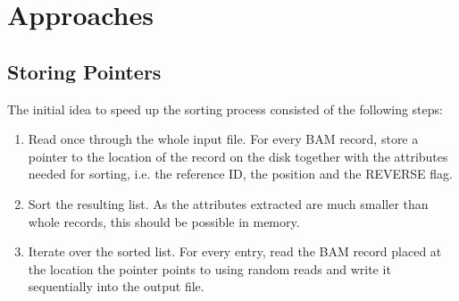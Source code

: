 \section{Approaches}
\subsection{Storing Pointers}
The initial idea to speed up the sorting process consisted of the following steps: 
\begin{enumerate}
    \item Read once through the whole input file. For every BAM record, store a pointer to the location of the record on the disk together with the attributes needed for sorting, i.e. the reference ID, the position and the REVERSE flag.
    \item Sort the resulting list. As the attributes extracted are much smaller than whole records, this should be possible in memory.
    \item Iterate over the sorted list. For every entry, read the BAM record placed at the location the pointer points to using random reads and write it sequentially into the output file.
\end{enumerate}

